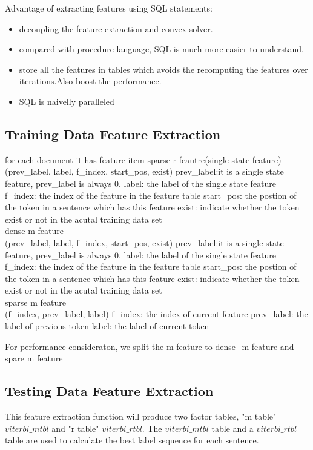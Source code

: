 Advantage of extracting features using SQL statements:
\begin{itemize}
\item decoupling the feature extraction and convex solver.
\item compared with procedure language, SQL is much more easier to understand.
\item store all the features in tables which avoids the recomputing the features over iterations.Also boost the performance.
\item SQL is naivelly paralleled
\end{itemize}

\subsection{Training Data Feature Extraction}
for each document it has feature item
sparse r feautre(single state feature) \\
(prev_label, label, f_index, start_pos, exist)
prev_label:it is a single state feature, prev_label is always 0. 
label: the label of the single state feature
f_index: the index of the feature in the feature table
start_pos: the postion of the token in a sentence which has this feature
exist: indicate whether the token exist or not in the acutal training data set\\

dense m feature\\
(prev_label, label, f_index, start_pos, exist)
prev_label:it is a single state feature, prev_label is always 0. 
label: the label of the single state feature
f_index: the index of the feature in the feature table
start_pos: the postion of the token in a sentence which has this feature
exist: indicate whether the token exist or not in the acutal training data set\\

sparse m feature\\
(f_index, prev_label, label)
f_index: the index of current feature
prev_label: the label of previous token 
label: the label of current token

For performance consideraton, we split the m feature to dense_m feature and spare m feature\\

\subsection{Testing Data Feature Extraction}
  This feature extraction function will produce two factor tables, "m table"
  $viterbi\_mtbl$ and "r table" $viterbi\_rtbl$. The $viterbi\_mtbl$
  table and a $viterbi\_rtbl$ table are used to calculate the best label
  sequence for each sentence.
 
